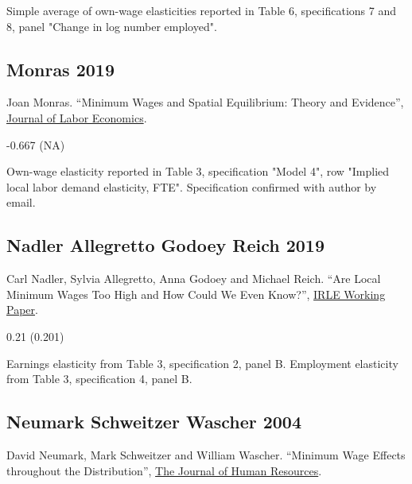  Simple average of own-wage elasticities reported in Table 6, specifications 7 and 8, panel "Change in log number employed".

\subsection*{Monras 2019}
\vspace{-0.7em}

\noindent Joan Monras. ``Minimum Wages and Spatial Equilibrium: Theory and Evidence'', \href{https://doi.org/10.1086/702650}{Journal of Labor Economics}.

\vspace{0.7em}

 -0.667 (NA)

\vspace{0.7em}

 Own-wage elasticity reported in Table 3, specification "Model 4", row "Implied local labor demand elasticity, FTE". Specification confirmed with author by email.

\subsection*{Nadler Allegretto Godoey Reich 2019}
\vspace{-0.7em}

\noindent Carl Nadler, Sylvia Allegretto, Anna Godoey and Michael Reich. ``Are Local Minimum Wages Too High and How Could We Even Know?'', \href{http://irle.berkeley.edu/files/2019/04/Are-Local-Minimum-Wages-Too-High.pdf}{IRLE Working Paper}.

\vspace{0.7em}

 0.21 (0.201)

\vspace{0.7em}

 Earnings elasticity from Table 3, specification 2, panel B. Employment elasticity from Table 3, specification 4, panel B.

\subsection*{Neumark Schweitzer Wascher 2004}
\vspace{-0.7em}

\noindent David Neumark, Mark Schweitzer and William Wascher. ``Minimum Wage Effects throughout the Distribution'', \href{https://doi.org/10.3368/jhr.XXXIX.2.425}{The Journal of Human Resources}.

